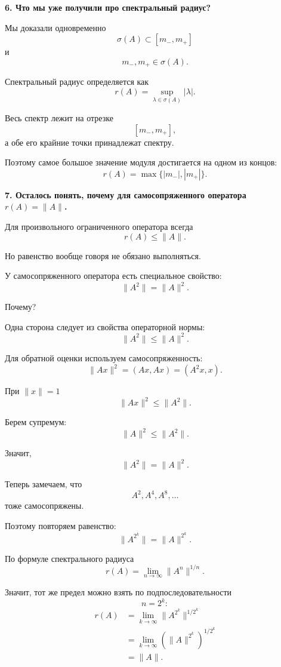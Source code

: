 \begin{idea}
	\medskip
	
	\textbf{6. Что мы уже получили про спектральный радиус?}
	
	Мы доказали одновременно
	\[
	\sigma(A)\subset[m_-,m_+]
	\]
	и
	\[
	m_-,m_+\in\sigma(A).
	\]
	
	Спектральный радиус определяется как
	\[
	r(A)
	=
	\sup_{\lambda\in\sigma(A)}|\lambda|.
	\]
	
	Весь спектр лежит на отрезке
	\[
	[m_-,m_+],
	\]
	а обе его крайние точки принадлежат спектру.
	
	Поэтому самое большое значение модуля достигается на одном из концов:
	\[
	\boxed{
		r(A)=\max\{|m_-|,|m_+|\}.
	}
	\]
	
	\medskip
	
	\textbf{7. Осталось понять, почему для самосопряженного оператора
		\(r(A)=\|A\|\).}
	
	Для произвольного ограниченного оператора всегда
	\[
	r(A)\leq\|A\|.
	\]
	
	Но равенство вообще говоря не обязано выполняться.
	
	У самосопряженного оператора есть специальное свойство:
	\[
	\boxed{\|A^2\|=\|A\|^2.}
	\]
	
	Почему?
	
	Одна сторона следует из свойства операторной нормы:
	\[
	\|A^2\|\leq\|A\|^2.
	\]
	
	Для обратной оценки используем самосопряженность:
	\[
	\|Ax\|^2
	=
	(Ax,Ax)
	=
	(A^2x,x).
	\]
	
	При \(\|x\|=1\)
	\[
	\|Ax\|^2
	\leq
	\|A^2\|.
	\]
	
	Берем супремум:
	\[
	\|A\|^2\leq\|A^2\|.
	\]
	
	Значит,
	\[
	\boxed{\|A^2\|=\|A\|^2.}
	\]
	
	Теперь замечаем, что
	\[
	A^2,A^4,A^8,\ldots
	\]
	тоже самосопряжены.
	
	Поэтому повторяем равенство:
	\[
	\|A^{2^k}\|
	=
	\|A\|^{2^k}.
	\]
	
	\medskip
	
	По формуле спектрального радиуса
	\[
	r(A)
	=
	\lim_{n\to\infty}
	\|A^n\|^{1/n}.
	\]
	
	Значит, тот же предел можно взять по подпоследовательности
	\[
	n=2^k:
	\]
	\[
	\begin{aligned}
		r(A)
		&=
		\lim_{k\to\infty}
		\|A^{2^k}\|^{1/2^k}
		\\
		&=
		\lim_{k\to\infty}
		\left(
		\|A\|^{2^k}
		\right)^{1/2^k}
		\\
		&=
		\|A\|.
	\end{aligned}
	\]
	

\end{idea}
